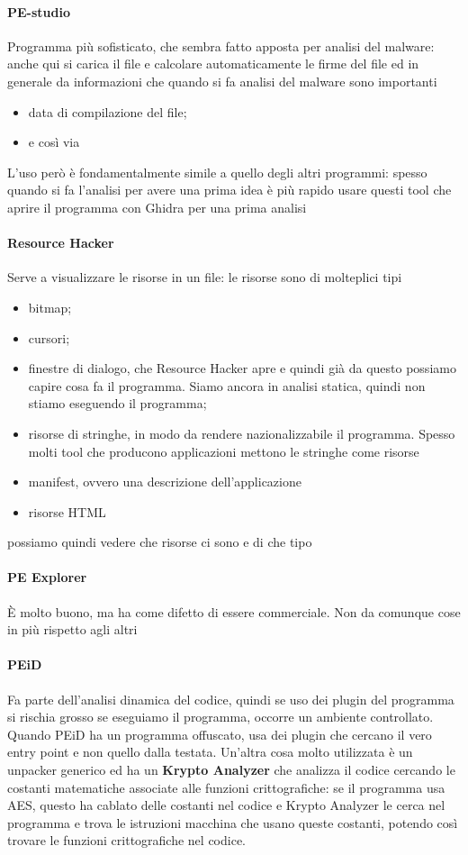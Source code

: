 \documentclass[12pt, oneside]{extbook}
\begin{document}
\paragraph{PE-studio} Programma più sofisticato, che sembra fatto apposta per analisi del malware: anche qui si carica il file e calcolare automaticamente le firme del file ed in generale da informazioni che quando si fa analisi del malware sono importanti
\begin{itemize}
\item data di compilazione del file; 
\item e così via
\end{itemize}
L'uso però è fondamentalmente simile a quello degli altri programmi: spesso quando si fa l'analisi per avere una prima idea è più rapido usare questi tool che aprire il programma con Ghidra per una prima analisi
\\
\paragraph{Resource Hacker} Serve a visualizzare le risorse in un file: le risorse sono di molteplici tipi
\begin{itemize}
\item bitmap;
\item cursori;
\item finestre di dialogo, che Resource Hacker apre e quindi già da questo possiamo capire cosa fa il programma. Siamo ancora in analisi statica, quindi non stiamo eseguendo il programma;
\item risorse di stringhe, in modo da rendere nazionalizzabile il programma. Spesso molti tool che producono applicazioni mettono le stringhe come risorse
\item manifest, ovvero una descrizione dell'applicazione
\item risorse HTML
\end{itemize}
possiamo quindi vedere che risorse ci sono e di che tipo
\\
\paragraph{PE Explorer} È molto buono, ma ha come difetto di essere commerciale. Non da comunque cose in più rispetto agli altri
\\
\paragraph{PEiD} Fa parte dell'analisi dinamica del codice, quindi se uso dei plugin del programma si rischia grosso se eseguiamo il programma, occorre un ambiente controllato. Quando PEiD ha un programma offuscato, usa dei plugin che cercano il vero entry point e non quello dalla testata. Un'altra cosa molto utilizzata è un unpacker generico ed ha un \textbf{Krypto Analyzer} che analizza il codice cercando le costanti matematiche associate alle funzioni crittografiche: se il programma usa AES, questo ha cablato delle costanti nel codice e Krypto Analyzer le cerca nel programma e trova le istruzioni macchina che usano queste costanti, potendo così trovare le funzioni crittografiche nel codice.
\end{document}
